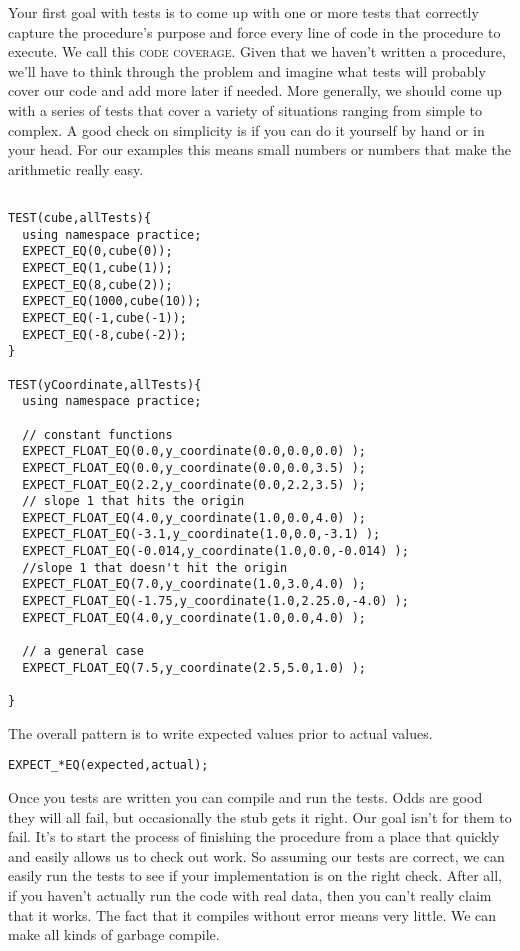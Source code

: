 \documentclass[]{tufte-handout}
\begin{document}
Your first goal with tests is to come up with one or more tests that correctly capture the procedure's purpose and force every line of code in the procedure to execute.  We call this \textsc{code coverage}. Given that we haven't written a procedure, we'll have to think through the problem and imagine what tests will probably cover our code and add more later if needed. More generally, we should come up with a series of tests that cover a variety of situations ranging from simple to complex. A good check on simplicity is if you can do it yourself by hand or in your head.  For our examples this means small numbers or numbers that make the arithmetic really easy. 


\begin{verbatim}

TEST(cube,allTests){
  using namespace practice;
  EXPECT_EQ(0,cube(0));
  EXPECT_EQ(1,cube(1));
  EXPECT_EQ(8,cube(2));
  EXPECT_EQ(1000,cube(10));
  EXPECT_EQ(-1,cube(-1));
  EXPECT_EQ(-8,cube(-2));
}

TEST(yCoordinate,allTests){
  using namespace practice;

  // constant functions
  EXPECT_FLOAT_EQ(0.0,y_coordinate(0.0,0.0,0.0) );
  EXPECT_FLOAT_EQ(0.0,y_coordinate(0.0,0.0,3.5) );
  EXPECT_FLOAT_EQ(2.2,y_coordinate(0.0,2.2,3.5) );
  // slope 1 that hits the origin
  EXPECT_FLOAT_EQ(4.0,y_coordinate(1.0,0.0,4.0) );
  EXPECT_FLOAT_EQ(-3.1,y_coordinate(1.0,0.0,-3.1) );
  EXPECT_FLOAT_EQ(-0.014,y_coordinate(1.0,0.0,-0.014) );
  //slope 1 that doesn't hit the origin
  EXPECT_FLOAT_EQ(7.0,y_coordinate(1.0,3.0,4.0) );
  EXPECT_FLOAT_EQ(-1.75,y_coordinate(1.0,2.25.0,-4.0) );
  EXPECT_FLOAT_EQ(4.0,y_coordinate(1.0,0.0,4.0) );
  
  // a general case
  EXPECT_FLOAT_EQ(7.5,y_coordinate(2.5,5.0,1.0) );

}
\end{verbatim}


The overall pattern is to write expected values prior to actual values. 
\begin{verbatim}
EXPECT_*EQ(expected,actual);
\end{verbatim}

Once you tests are written you can compile and run the tests.  Odds are good they will all fail, but occasionally the stub gets it right. Our goal isn't for them to fail. It's to start the process of finishing the procedure from a place that quickly and easily allows us to check out work. So assuming our tests are correct, we can easily run the tests to see if your implementation is on the right check. After all, if you haven't actually run the code with real data, then you can't really claim that it works. The fact that it compiles without error means very little. We can make all kinds of garbage compile.
\end{document}
